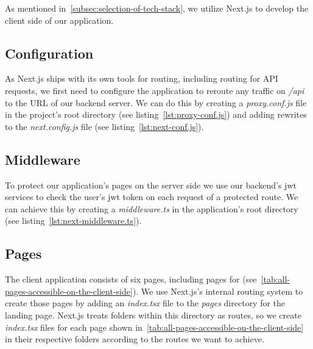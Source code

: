 As mentioned in~\cref{subsec:selection-of-tech-stack}, we utilize Next.js to develop the client side of our application.

\subsection{Configuration}\label{subsec:configuration}

As Next.js ships with its own tools for routing, including routing for \gls{API} requests, we first need to configure the application to reroute any traffic on \emph{/api} to the \gls{URL} of our backend server.
We can do this by creating a \emph{proxy.conf.js} file in the project's root directory (see listing~\ref{lst:proxy-conf.js}) and adding rewrites to the \emph{next.config.js} file (see listing~\ref{lst:next-conf.js}).


\subsection{Middleware}\label{subsec:middleware}

To protect our application's pages on the server side we use our backend's jwt services to check the user's jwt token on each request of a protected route.
We can achieve this by creating a \emph{middleware.ts} in the application's root directory (see listing~\ref{lst:next-middleware.ts}).


\subsection{Pages}\label{subsec:pages}


The client application consists of six pages, including pages for  (see~\cref{tab:all-pages-accessible-on-the-client-side}).
We use Next.js's internal routing system to create those pages by adding an \emph{index.tsx} file to the \emph{pages} directory for the landing page.
Next.js treats folders within this directory as routes, so we create \emph{index.tsx} files for each page shown in~\cref{tab:all-pages-accessible-on-the-client-side} in their respective folders according to the routes we want to achieve.

